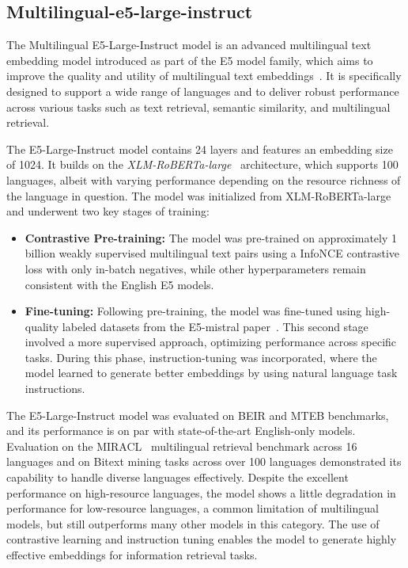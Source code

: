 \subsection{Multilingual-e5-large-instruct}\label{subsec:nextcloud-ai}
The Multilingual E5-Large-Instruct model is an advanced multilingual text embedding model introduced as part of the E5 model family, which aims to improve the quality and utility of multilingual text embeddings~\cite{wang2024multilinguale5textembeddings}.
It is specifically designed to support a wide range of languages and to deliver robust performance across various tasks such as text retrieval, semantic similarity, and multilingual retrieval.

The E5-Large-Instruct model contains 24 layers and features an embedding size of 1024.
It builds on the \textit{XLM-RoBERTa-large}~\cite{DBLP:journals/corr/abs-1911-02116} architecture, which supports 100 languages, albeit with varying performance depending on the resource richness of the language in question.
The model was initialized from XLM-RoBERTa-large and underwent two key stages of training:
\begin{itemize}
    \item \textbf{Contrastive Pre-training:} The model was pre-trained on approximately 1 billion weakly supervised multilingual text pairs using a InfoNCE contrastive loss with only in-batch negatives, while other hyperparameters remain consistent with the English E5 models.
    \item \textbf{Fine-tuning:} Following pre-training, the model was fine-tuned using high-quality labeled datasets from the E5-mistral paper~\cite{wang2024improvingtextembeddingslarge}. This second stage involved a more supervised approach, optimizing performance across specific tasks. During this phase, instruction-tuning was incorporated, where the model learned to generate better embeddings by using natural language task instructions.
\end{itemize}
The E5-Large-Instruct model was evaluated on BEIR and MTEB benchmarks, and its performance is on par with state-of-the-art English-only models.
Evaluation on the MIRACL~\cite{zhang-etal-2023-miracl} multilingual retrieval benchmark across 16 languages and on Bitext mining tasks across over 100 languages demonstrated its capability to handle diverse languages effectively.
Despite the excellent performance on high-resource languages, the model shows a little degradation in performance for low-resource languages, a common limitation of multilingual models, but still outperforms many other models in this category.
The use of contrastive learning and instruction tuning enables the model to generate highly effective embeddings for information retrieval tasks.
